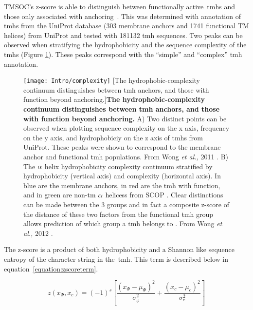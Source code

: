 TMSOC's z-score is able to distinguish between functionally active~\gls{tmh}s and those only associated with anchoring~\cite{Wong2011, Wong2012}.
This was determined with annotation of \gls{tmh}s from the UniProt database (303 membrane anchors and 1741 functional TM helices) from UniProt \cite{TheUniProtConsortium2014} and tested with 181132 \gls{tmh} sequences.
Two peaks can be observed when stratifying the hydrophobicity and the sequence complexity of the \gls{tmh}s (Figure \ref{fig:complexity}).
These peaks correspond with the ``simple'' and ``complex'' \gls{tmh} annotation.

\begin{figure}[ht]
\centering
\texttt{[image: Intro/complexity]}
		[The hydrophobic\--complexity continuum distinguishes between \gls{tmh} anchors, and those with function beyond anchoring.]{\textbf{The hydrophobic\--complexity continuum distinguishes between \gls{tmh} anchors, and those with function beyond anchoring.}
		A) Two distinct points can be observed when plotting sequence complexity on the x axis, frequency on the y axis, and hydrophobiciy on the z axis of \gls{tmh}s from UniProt.
		These peaks were shown to correspond to the membrane anchor and functional \gls{tmh} populations.
		From Wong \textit{et al.,} 2011 \cite{Wong2011}.
		B) The $\protect\alpha$ helix hydrophobicity complexity continuum stratified by hydrophobicity (vertical axis) and complexity (horizontal axis).
		In blue are the membrane anchors, in red are the \gls{tmh} with function, and in green are non\--\gls{tm} $\protect\alpha$ helicess from SCOP \cite{Murzin1995}.
		Clear distinctions can be made between the 3 groups and in fact a composite z-score of the distance of these two factors from the functional \gls{tmh} group allows prediction of which group a \gls{tmh} belongs to \cite{Wong2011, Wong2012}.
		From Wong \textit{et al.,} 2012 \cite{Wong2012}.
		}
\label{fig:complexity}
\end{figure}

The z-score is a product of both hydrophobicity and a Shannon like sequence entropy \cite{Wong2011, Wong2012} of the character string in the~\gls{tmh}. This term is described below in equation~\ref{equation:zscoreterm}.

\begin{equation} \label{equation:zscoreterm}
z({x}_{\Phi},{x}_{c})={(-1)}^{s}\left[\frac{{({x}_{\Phi}-{\mu}_{\Phi})}^{2}}{{\sigma}_{\phi}^{2}}+\frac{{({x}_{c}-{\mu}_{c})}^{2}}{{\sigma}_{c}^{2}}\right]
\end{equation}

